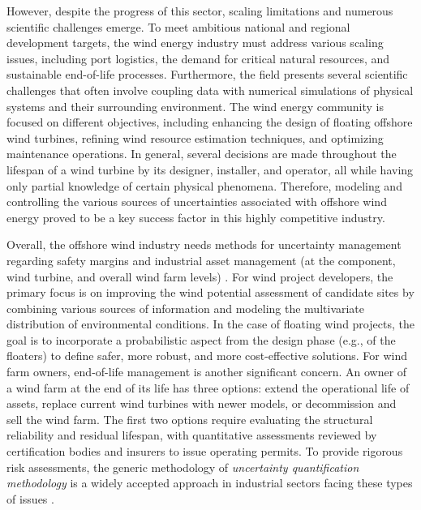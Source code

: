 However, despite the progress of this sector, scaling limitations and numerous scientific challenges emerge. 
To meet ambitious national and regional development targets, the wind energy industry must address various scaling issues, including port logistics, the demand for critical natural resources, and sustainable end-of-life processes. 
Furthermore, the field presents several scientific challenges that often involve coupling data with numerical simulations of physical systems and their surrounding environment. 
The wind energy community is focused on different objectives, including enhancing the design of floating offshore wind turbines, refining wind resource estimation techniques, and optimizing maintenance operations. 
In general, several decisions are made throughout the lifespan of a wind turbine by its designer, installer, and operator, all while having only partial knowledge of certain physical phenomena. 
Therefore, modeling and controlling the various sources of uncertainties associated with offshore wind energy proved to be a key success factor in this highly competitive industry.

Overall, the offshore wind industry needs methods for uncertainty management regarding safety margins and industrial asset management (at the component, wind turbine, and overall wind farm levels) \citep{OWT_review_2016}. 
For wind project developers, the primary focus is on improving the wind potential assessment of candidate sites by combining various sources of information and modeling the multivariate distribution of environmental conditions. 
In the case of floating wind projects, the goal is to incorporate a probabilistic aspect from the design phase (e.g., of the floaters) to define safer, more robust, and more cost-effective solutions.
For wind farm owners, end-of-life management is another significant concern. 
An owner of a wind farm at the end of its life has three options: extend the operational life of assets, replace current wind turbines with newer models, or decommission and sell the wind farm. 
The first two options require evaluating the structural reliability and residual lifespan, with quantitative assessments reviewed by certification bodies and insurers to issue operating permits. 
To provide rigorous risk assessments, the generic methodology of \textit{uncertainty quantification methodology} is a widely accepted approach in industrial sectors facing these types of issues \citep{rocquigny_2008,blanchard_2023}.



